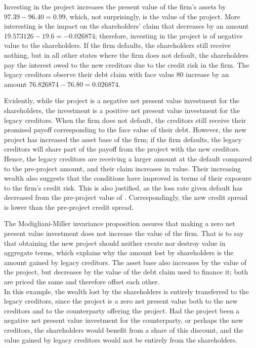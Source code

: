 \documentclass[main.tex]{subfiles}
\begin{document}
        Investing in the project increases the present value of the firm's assets by $\num{97.39} - \num{96.40} = \num{0.99}$, 
        which, not surprisingly, is the value of the project.
        More interesting is the impact on the shareholders' claim that decreases by an amount $\num{19.573126} - \num{19.6} = \num{-0.026874}$; 
        therefore, investing in the project is of negative value to the shareholders.
        If the firm defaults, the shareholders still receive nothing, 
        but in all other states where the firm does not default, 
        the shareholders pay the interest owed to the new creditors 
        due to the credit risk in the firm.
        The legacy creditors observe their debt claim with face value $\num{80}$ increase by an amount
        $\num{76.826874} - \num{76.80} = \num{0.026874}$.

        Evidently, while the project is a negative net present value investment for the shareholders,
        the investment is a positive net present value investment for the legacy creditors.
        When the firm does not default, the creditors still receive their promised payoff 
        corresponding to the face value of their debt.
        However, the new project has increased the asset base of the firm; if the firm defaults, 
        the legacy creditors will share part of the payoff from the project with the new creditors.
        Hence, the legacy creditors are receiving a larger amount at the default compared to the pre-project amount, and their claim increases in value.
        Their increasing wealth also suggests that the conditions have improved in terms of their exposure to the firm's credit risk.
        This is also justified, as the loss rate given default has decreased from the pre-project value of .
        Correspondingly, the new credit spread is lower than the pre-project credit spread.

        The Modigliani-Miller invariance proposition assures that making a zero net present value investment 
        does not increase the value of the firm.
        That is to say that obtaining the new project should neither create nor destroy value in aggregate terms,
        which explains why the amount lost by shareholders is the amount gained by legacy creditors.
        The asset base also increases by the value of the project, 
        but decreases by the value of the debt claim used to finance it; 
        both are priced the same and therefore offset each other.
        \\
        In this example, the wealth lost by the shareholders is entirely transferred to the legacy creditors,
        since the project is a zero net present value both to the new creditors 
        and to the counterparty offering the project.
        Had the project been a negative net present value investment for the counterparty, 
        or perhaps the new creditors, the shareholders would benefit from a share of this discount,
        and the value gained by legacy creditors would not be entirely from the shareholders.
\end{document}
